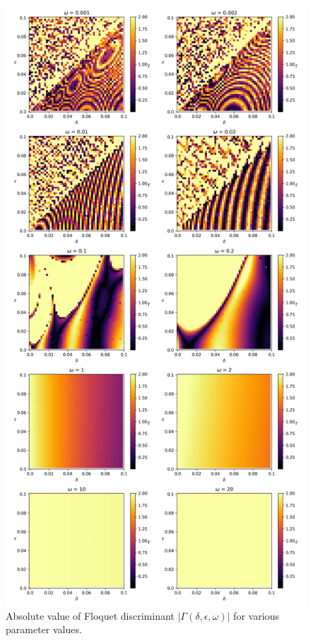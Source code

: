 \documentclass[12pt, a4paper]{article}
\begin{document}
\begin{enumerate}
\begin{enumerate}
        \begin{figure}[H]
            \centering
            \includegraphics[width=12cm]{Gamma_color.png}
            \caption{Absolute value of Floquet discriminant $|\Gamma(\delta, \epsilon, \omega)|$ for various parameter values.}
        \end{figure}


\end{enumerate}
\end{enumerate}
\end{document}
